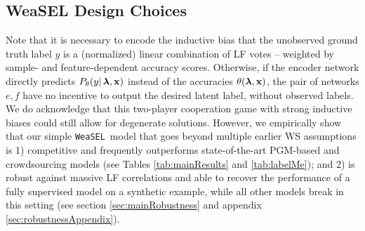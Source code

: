 \documentclass{article}
\newcommand{\weasel}{\texttt{WeaSEL}}\newcommand{\brackets}[1]{\left( #1 \right)}
\newcommand{\features}{\mathbf{x}}
\begin{document}
\subsection{WeaSEL Design Choices}
\vspace{-2mm}
Note that it is necessary to encode the inductive bias that the unobserved ground truth label $y$ is a (normalized) linear combination of LF votes -- weighted by sample- and feature-dependent accuracy scores. Otherwise, if the encoder network directly predicts $P_\theta(y |\lfs, \features)$ instead of the accuracies $\theta(\lfs, \features)$, the pair of networks $e, f$ have no incentive to output the desired latent label, without observed labels.  We do acknowledge that this two-player cooperation game with strong inductive biases could still allow for degenerate solutions. However, we empirically show that our simple \weasel\  model that goes beyond multiple earlier WS assumptions is 1) competitive and frequently outperforms state-of-the-art PGM-based and crowdsourcing models (see Tables \ref{tab:mainResults} and \ref{tab:labelMe}); and 2) is robust against massive LF correlations and able to recover the performance of a fully supervised model on a synthetic example, while all other models break in this setting (see section \ref{sec:mainRobustness} and appendix \ref{sec:robustnessAppendix}).  
\end{document}

